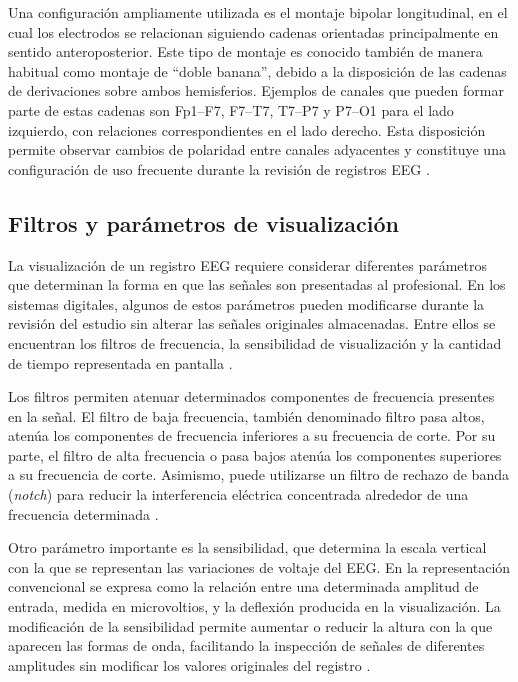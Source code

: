Una configuración ampliamente utilizada es el montaje bipolar longitudinal,
en el cual los electrodos se relacionan siguiendo cadenas orientadas
principalmente en sentido anteroposterior. Este tipo de montaje es conocido
también de manera habitual como montaje de ``doble banana'', debido a la
disposición de las cadenas de derivaciones sobre ambos hemisferios. Ejemplos
de canales que pueden formar parte de estas cadenas son Fp1--F7, F7--T7,
T7--P7 y P7--O1 para el lado izquierdo, con relaciones correspondientes en
el lado derecho. Esta disposición permite observar cambios de polaridad entre
canales adyacentes y constituye una configuración de uso frecuente durante
la revisión de registros EEG
\citep{StLouisFrey2016EEG,Acharya2016Montages}.

\subsection{Filtros y parámetros de visualización}
\label{subsec:filtros-parametros-eeg}

La visualización de un registro EEG requiere considerar diferentes parámetros
que determinan la forma en que las señales son presentadas al profesional.
En los sistemas digitales, algunos de estos parámetros pueden modificarse
durante la revisión del estudio sin alterar las señales originales
almacenadas. Entre ellos se encuentran los filtros de frecuencia, la
sensibilidad de visualización y la cantidad de tiempo representada en
pantalla \citep{StLouisFrey2016EEG,Sinha2016EEGTechnical}.

Los filtros permiten atenuar determinados componentes de frecuencia presentes
en la señal. El filtro de baja frecuencia, también denominado filtro pasa altos,
atenúa los componentes de frecuencia inferiores a su frecuencia
de corte. Por su parte, el filtro de alta frecuencia o pasa bajos
atenúa los componentes superiores a su frecuencia de corte. Asimismo, puede utilizarse un filtro de rechazo de banda
(\textit{notch}) para reducir la interferencia eléctrica concentrada alrededor
de una frecuencia determinada \citep{StLouisFrey2016EEG}.

Otro parámetro importante es la sensibilidad, que determina la escala vertical
con la que se representan las variaciones de voltaje del EEG. En la
representación convencional se expresa como la relación entre una determinada
amplitud de entrada, medida en microvoltios, y la deflexión producida en la
visualización. La modificación de la sensibilidad permite aumentar o reducir
la altura con la que aparecen las formas de onda, facilitando la inspección de
señales de diferentes amplitudes sin modificar los valores originales del
registro \citep{StLouisFrey2016EEG,Sinha2016EEGTechnical}.

